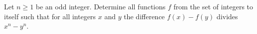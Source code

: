 \documentclass[preview]{standalone}
\begin{document}
\begin{center}
Let $n \geqslant 1$ be an odd integer. Determine all functions $f$ from the set of integers to itself such that for all integers $x$ and $y$ the difference $f(x)-f(y)$ divides $x^{n}-y^{n}$.
\end{center}
\end{document}
